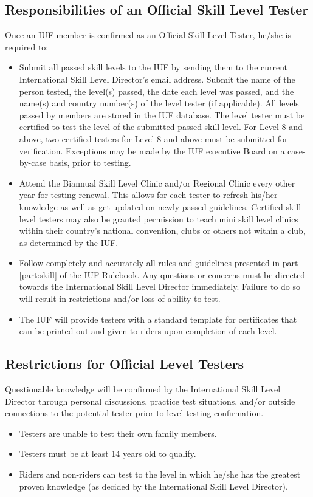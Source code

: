 \subsection{Responsibilities of an Official Skill Level Tester}
Once an IUF member is confirmed as an Official Skill Level Tester, he/she is required to:
\begin{itemize}
\item Submit all passed skill levels to the IUF by sending them to the current International Skill Level Director's email address.
Submit the name of the person tested, the level(s) passed, the date each level was passed, and the name(s) and country number(s) of the level tester (if applicable).
All levels passed by members are stored in the IUF database.
The level tester must be certified to test the level of the submitted passed skill level.
For Level 8 and above, two certified testers for Level 8 and above must be submitted for verification.
Exceptions may be made by the IUF executive Board on a case-by-case basis, prior to testing.
\item Attend the Biannual Skill Level Clinic and/or Regional Clinic every other year for testing renewal.
This allows for each tester to refresh his/her knowledge as well as get updated on newly passed guidelines.
Certified skill level testers may also be granted permission to teach mini skill level clinics within their country's national convention, clubs or others not within a club, as determined by the IUF.
\item Follow completely and accurately all rules and guidelines presented in part \ref{part:skill} of the IUF Rulebook.
Any questions or concerns must be directed towards the International Skill Level Director immediately.
Failure to do so will result in restrictions and/or loss of ability to test.
\item The IUF will provide testers with a standard template for certificates that can be printed out and given to riders upon completion of each level.
\end{itemize}

\subsection{Restrictions for Official Level Testers}
Questionable knowledge will be confirmed by the International Skill Level Director through personal discussions, practice test situations, and/or outside connections to the potential tester prior to level testing confirmation.
\begin{itemize}
\item Testers are unable to test their own family members.
\item Testers must be at least 14 years old to qualify.
\item Riders and non-riders can test to the level in which he/she has the greatest proven knowledge (as decided by the International Skill Level Director).
\end{itemize}

